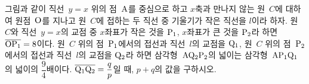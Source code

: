 \noindent\begin{minipage}[t]{0.58\linewidth}\vspace{0pt}\raggedright 그림과 같이 직선~$y=x$ 위의 점~$\mathrm{A}$를 중심으로 하고 $x$축과 만나지 않는 원~$C$에 대하여 원점~$\mathrm{O}$를 지나고 원~$C$에 접하는 두 직선 중 기울기가 작은 직선을 $l$이라 하자. 원~$C$와 직선~$y=x$의 교점 중 $x$좌표가 작은 것을 $\mathrm{P_1}$, $x$좌표가 큰 것을 $\mathrm{P_2}$라 하면 $\overline{\mathrm{OP_1}}=8$이다. 원~$C$ 위의 점~$\mathrm{P_1}$에서의 접선과 직선~$l$의 교점을 $\mathrm{Q_1}$, 원~$C$ 위의 점~$\mathrm{P_2}$에서의 접선과 직선~$l$의 교점을 $\mathrm{Q_2}$라 하면 삼각형~$\mathrm{AQ_2P_2}$의 넓이는 삼각형~$\mathrm{AP_1Q_1}$의 넓이의 $\dfrac{9}{4}$배이다. $\overline{\mathrm{Q_1Q_2}}=\dfrac{q}{p}$일 때, $p+q$의 값을 구하시오. \end{minipage}\hfill\begin{minipage}[t]{0.4\linewidth}\vspace{0pt}\centering \resizebox{\ifdim\width>\linewidth\linewidth\else\width\fi}{!}{}\end{minipage}\par
